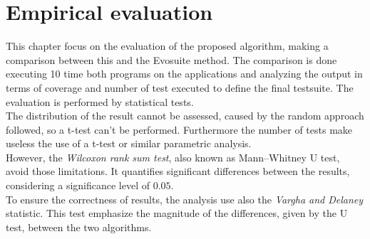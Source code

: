 \chapter{Empirical evaluation} \label{ch:EmpEvaluation}
This chapter focus on the evaluation of the proposed algorithm, making a comparison between this and the Evosuite method.
The comparison is done executing 10 time both programs on the applications and analyzing the output in terms of coverage and number of test executed to define the final testsuite.
The evaluation is performed by statistical tests.\\
The distribution of the result cannot be assessed, caused by the random approach followed, so a t-test can't be performed.
Furthermore the number of tests make useless the use of a t-test or similar parametric analysis.\\
However, the \emph{Wilcoxon rank sum test}, also known as Mann–Whitney U test, avoid those limitations.
It quantifies significant differences between the results, considering a significance level of $0.05$.\\
To ensure the correctness of results, the analysis use also the \emph{Vargha and Delaney} statistic.
This test emphasize the magnitude of the differences, given by the U test, between the two algorithms.

